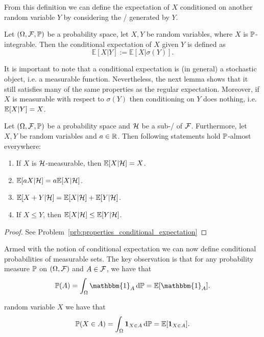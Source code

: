 From this definition we can define the expectation of $X$ conditioned on another random variable $Y$ by considering the \sigalg/ generated by $Y$.

\begin{definition}
Let $(\Omega, \mathcal F, \mathbb P)$ be a probability space, let $X,Y$ be random variables, where $X$ is $\mathbb P$-integrable. Then the conditional expectation of $X$ given $Y$ is defined as
\[
\mathbb{E}[X | Y] := \mathbb{E}[ X | \sigma(Y) ].
\]	
\end{definition}


It is important to note that a conditional expectation is (in general) a stochastic object, i.e. a measurable function. Nevertheless, the next lemma shows that it still satisfies many of the same properties as the regular expectation. Moreover, if $X$ is measurable with respect to $\sigma(Y)$ then conditioning on $Y$ does nothing, i.e. $\mathbb E[X|Y] = X$.

\begin{lemma}\label{lem:properties_conditional_expectation}
Let $(\Omega, \mathcal F, \mathbb P)$ be a probability space and $\mathcal H$ be a sub-\sigalg/ of $\mathcal F$. Furthermore, let $X, Y$ be random variables and $a \in \mathbb R$. Then following statements hold $\mathbb P$-almost everywhere:
\begin{enumerate}[label={(\alph*)}]
\item If $X$ is $\mathcal H$-measurable, then $\mathbb E[X | \mathcal H] = X$.
\item $\mathbb E[a X | \mathcal H] = a \mathbb E[X | \mathcal H]$.
\item $\mathbb E[X + Y | \mathcal H] = \mathbb E[X | \mathcal H] + \mathbb E[Y | \mathcal H]$.
\item If $X \le Y$, then $\mathbb E[X | \mathcal H] \le \mathbb E[Y | \mathcal H]$.
\end{enumerate}
\end{lemma}

\begin{proof}
See Problem~\ref{prb:properties_conditional_expectation}
\end{proof}


Armed with the notion of conditional expectation we can now define conditional probabilities of measurable sets. The key observation is that for any probability measure $\mathbb P$ on $(\Omega, \mathcal F)$ and $A \in \mathcal F$, we have that
\[
	\bbP(A) = \int_\Omega \mathbbm{1}_{A} \, \dd \bbP = \bbE[\mathbbm{1}_A].
\]

random variable $X$ we have that
\[
	\mathbb P(X \in A) = \int_\Omega \mathbf{1}_{X \in A} \, \mathrm{d} \mathbb P = \mathbb E[\mathbf{1}_{X \in A}].
\]

